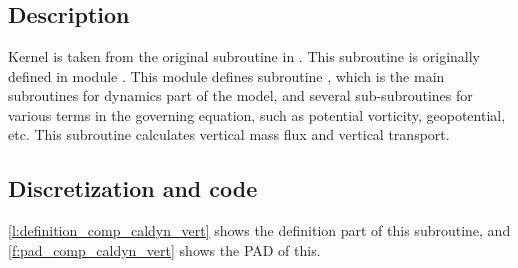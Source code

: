 \section{}

\subsection{Description}

Kernel  is taken from the original subroutine
 in \DYNAMICO.
%
This subroutine is originally defined in module .
%
This module defines subroutine , which is the main
subroutines for dynamics part of the model, and several sub-subroutines
for various terms in the governing equation, such as potential
vorticity, geopotential, etc.
%
This subroutine calculates vertical mass flux and vertical transport.



\subsection{Discretization and code}


\autoref{l:definition_comp_caldyn_vert} shows the definition part of this subroutine,
and \autoref{f:pad_comp_caldyn_vert} shows the PAD of this.


